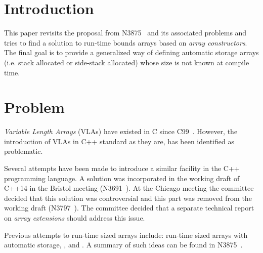 \section{Introduction}

This paper revisits the proposal from N3875~\cite{n3875} and its associated
problems and tries to find a solution to run-time bounds arrays based on
\emph{array constructors}. The final goal is to provide a generalized way of
defining automatic storage arrays (i.e. stack allocated or side-stack allocated)
whose size is not known at compile time.

\section{Problem}

\emph{Variable Length Arrays} (VLAs) have existed in C since C99~\cite{c99}. However,
the introduction of VLAs in C++ standard as they are, has been identified as
problematic.

Several attempts have been made to introduce a similar facility in the C++
programming language. A solution was incorporated in the working draft of C++14
in the Bristol meeting (N3691~\cite{n3691}). At the Chicago meeting the committee
decided that this solution was controversial and this part was removed from the
working draft (N3797~\cite{n3797}). The committee decided that a separate
technical report on \emph{array extensions} should address this issue.

Previous attempts to run-time sized arrays include: run-time sized arrays with
automatic storage, , and . A summary of such ideas can be found
in N3875~\cite{n3875}.


